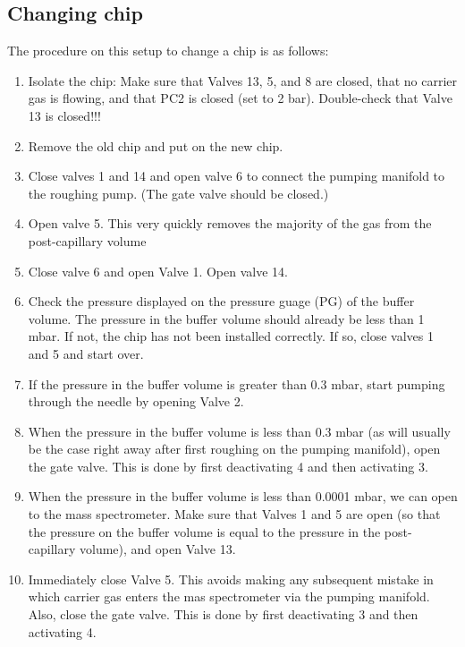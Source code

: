 \subsection{Changing chip}
The procedure on this setup to change a chip is as follows:
\begin{enumerate}
	\item Isolate the chip: Make sure that Valves 13, 5, and 8 are closed, that no carrier gas is flowing, and that PC2 is closed (set to 2 bar). Double-check that Valve 13 is closed!!!
	
	\item Remove the old chip and put on the new chip.
	
	\item Close valves 1 and 14 and open valve 6 to connect the pumping manifold to the roughing pump. (The gate valve should be closed.)
	
	\item Open valve 5. This very quickly removes the majority of the gas from the post-capillary volume
	
	\item Close valve 6 and open Valve 1. Open valve 14.  
	
	\item Check the pressure displayed on the pressure guage (PG) of the buffer volume. The pressure in the buffer volume should already be less than 1 mbar. If not, the chip has not been installed correctly. If so, close valves 1 and 5 and start over.
	
	\item If the pressure in the buffer volume is greater than 0.3 mbar, start pumping through the needle by opening Valve 2.
	
	\item When the pressure in the buffer volume is less than 0.3 mbar (as will usually be the case right away after first roughing on the pumping manifold), open the gate valve. This is done by first deactivating 4 and then activating 3.
	
	\item When the pressure in the buffer volume is less than 0.0001 mbar, we can open to the mass spectrometer. Make sure that Valves 1 and 5 are open (so that the pressure on the buffer volume is equal to the pressure in the post-capillary volume), and open Valve 13.
	
	\item Immediately close Valve 5. This avoids making any subsequent mistake in which carrier gas enters the mas spectrometer via the pumping manifold. Also, close the gate valve. This is done by first deactivating 3 and then activating 4.
\end{enumerate}


